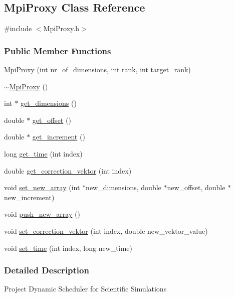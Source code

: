\hypertarget{a00027}{}\subsection{Mpi\+Proxy Class Reference}
\label{a00027}


{\ttfamily \#include $<$Mpi\+Proxy.\+h$>$}

\subsubsection*{Public Member Functions}
\begin{DoxyCompactItemize}
\item 
\hyperlink{a00027_ad22c1c930a79774e8ffaa83a2d3c4d0a}{Mpi\+Proxy} (int nr\+\_\+of\+\_\+dimensions, int rank, int target\+\_\+rank)
\item 
\hyperlink{a00027_a7ae10385700f03ae8540f51df13b9bd5}{$\sim$\+Mpi\+Proxy} ()
\item 
int $\ast$ \hyperlink{a00027_a20a8ccb288eac8a7afe0685d7d326be6}{get\+\_\+dimensions} ()
\item 
double $\ast$ \hyperlink{a00027_a2fec3ea7837878aec42f111f260e892e}{get\+\_\+offset} ()
\item 
double $\ast$ \hyperlink{a00027_a3d0fdc842c0a2534fefeff5281c48feb}{get\+\_\+increment} ()
\item 
long \hyperlink{a00027_ad61ef78eb8e9c0ce3d6bccf2f31373ed}{get\+\_\+time} (int index)
\item 
double \hyperlink{a00027_a8669e778c6946551fed36437199b3f29}{get\+\_\+correction\+\_\+vektor} (int index)
\item 
void \hyperlink{a00027_a5b23a639ad129acb53669adea92621d1}{set\+\_\+new\+\_\+array} (int $\ast$new\+\_\+dimensions, double $\ast$new\+\_\+offset, double $\ast$new\+\_\+increment)
\item 
void \hyperlink{a00027_a0da318d216e55c3d9e6a0c82eae86ad5}{push\+\_\+new\+\_\+array} ()
\item 
void \hyperlink{a00027_a72e4d7eaa47e6b9e06b699e8c22d6125}{set\+\_\+correction\+\_\+vektor} (int index, double new\+\_\+vektor\+\_\+value)
\item 
void \hyperlink{a00027_acdd2ee63120b275fde43e6c4d5f62f29}{set\+\_\+time} (int index, long new\+\_\+time)
\end{DoxyCompactItemize}


\subsubsection{Detailed Description}
Project Dynamic Scheduler for Scientific Simulations 

